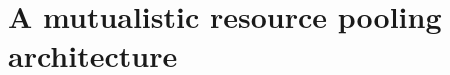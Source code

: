 \chapter{A mutualistic resource pooling architecture}
\label{sec:preflex}

\renewcommand{\locfolder}{\chapfolder/preflex}




